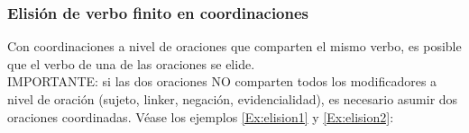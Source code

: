\documentclass[a4paper,11pt,DIV12]{scrartcl}
\begin{document}
% 

\subsubsection{Elisi\'on de verbo finito en coordinaciones}
Con coordinaciones a nivel de oraciones que comparten el mismo verbo, es posible que el verbo de una de las oraciones se elide.\\
IMPORTANTE: si las dos oraciones NO comparten todos los modificadores a nivel de oraci\'on (sujeto, linker, negaci\'on, evidencialidad), es necesario asumir dos oraciones coordinadas. V\'ease los ejemplos \ref{Ex:elision1} y \ref{Ex:elision2}:
\end{document}
